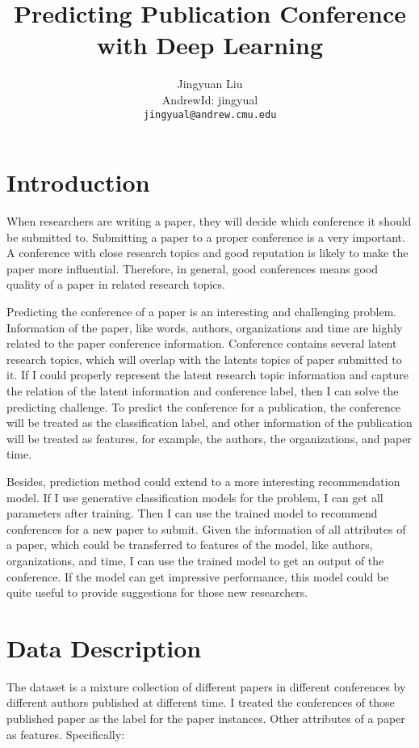 \documentclass{article} %
\title{Predicting Publication Conference with Deep Learning}
\author{
Jingyuan Liu\\
AndrewId: jingyual\\
\texttt{jingyual@andrew.cmu.edu} \\
}
\begin{document}
\maketitle


\section{Introduction}
When researchers are writing a paper, they will decide which conference it
should be submitted to. Submitting a paper to a proper conference is a very
important. A conference with close research topics and good reputation is likely to
make the paper more influential. Therefore, in general, good conferences means
good quality of a paper in related research topics.

Predicting the conference of a paper is an interesting and challenging problem.
Information of the paper, like words, authors, organizations and time are highly related to
the paper conference information. Conference contains several latent research
topics, which will overlap with the latents topics of paper submitted to it. If
I could properly represent the latent research topic information and capture the
relation of the latent information and conference label, then I can solve the
predicting challenge. To predict the conference for a publication, the
conference will be treated as the classification label, and other information
of the publication will be treated as features, for example, the authors,
the organizations, and paper time.

Besides, prediction method could extend to a more interesting recommendation model.
If I use generative classification models for the problem, I can get all parameters
after training. Then I can use the trained model to recommend conferences for a
new paper to submit. Given the information of all attributes of a paper, which
could be transferred to features of the model, like authors, organizations, and
time, I can use the trained model to get an output of the conference. If the
model can get impressive performance, this model could be quite useful to
provide suggestions for those new researchers.

\section{Data Description}
The dataset is a mixture collection of different papers in
different conferences by different authors published at different time. I
treated the conferences of those published paper as the label for the paper
instances. Other attributes of a paper as features. Specifically:
\end{document}
